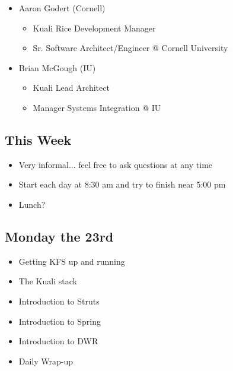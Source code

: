 \documentclass[12pt,notitlepage]{article}
\begin{document}
\begin{s5presentation}
\begin{s5slide}
\begin{ifhtml}
\begin{itemize}
\begin{itemize}
              \item Primary focus: Kuali, Portal, Workflow, Integration, Training, Java Environment Support and general R\&D
              \end{itemize}
          \item Aaron Godert (Cornell)
              \begin{itemize}
              \item Kuali Rice Development Manager
              \item Sr. Software Architect/Engineer @ Cornell University
              \end{itemize}
          \item Brian McGough (IU)
                \begin{itemize}
                \item Kuali Lead Architect
                \item Manager Systems Integration @ IU
                \end{itemize}
        \end{itemize}
      \end{ifhtml} 
    \W \end{s5slide}
    \W \begin{s5slide}
        \W \section{This Week}
        \begin{ifhtml}
            \begin{itemize}
                \item Very informal... feel free to ask questions at any time
                \item Start each day at 8:30 am and try to finish near 5:00 pm
                \item Lunch?
            \end{itemize}
            
        \end{ifhtml} 
    \W \end{s5slide}
    \W \begin{s5slide}
        \W \section{Monday the 23rd}
        \begin{ifhtml}
            \begin{itemize}
                \item Getting KFS up and running
                \item The Kuali stack
                \item Introduction to Struts
                \item Introduction to Spring
                \item Introduction to DWR
                \item Daily Wrap-up
            \end{itemize}
            

\end{ifhtml}
\end{s5slide}
\end{s5presentation}
\end{document}

